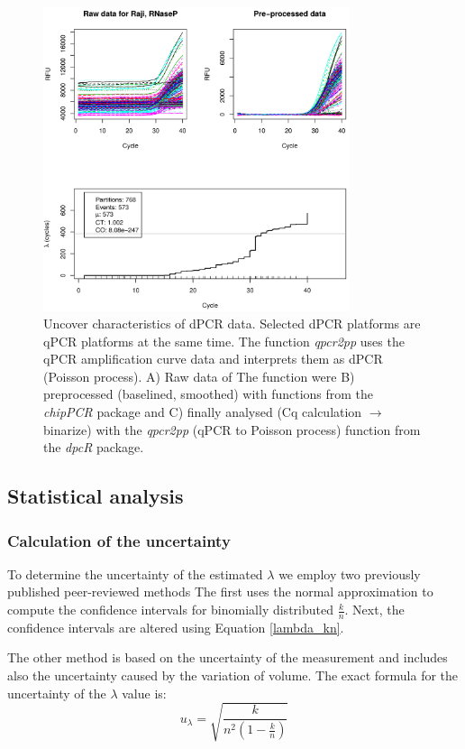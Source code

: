 \documentclass[a4,center,fleqn]{NAR}
\begin{document}
\begin{figure}[t]
\begin{center}
\includegraphics[width=9cm]{qpcr2pp_1.png}
\end{center}
\caption{Uncover characteristics of dPCR data. Selected dPCR platforms are qPCR 
platforms at the same time. The function \textit{qpcr2pp} uses the qPCR 
amplification curve data and interprets them as dPCR (Poisson process). A) Raw 
data of The function were B) preprocessed (baselined, smoothed) with functions 
from the \textit{chipPCR} package and C) finally analysed (Cq calculation 
$\rightarrow$ binarize) with the \textit{qpcr2pp} (qPCR to Poisson process) 
function from the \textit{dpcR} package.} 
\label{qpcr2pp_1}
\end{figure}

\subsection{Statistical analysis}

\subsubsection{Calculation of the uncertainty}
To determine the uncertainty of the estimated $\lambda$ we employ two previously 
published peer-reviewed methods The first \cite{dube_mathematical_2008} uses the 
normal approximation to compute the confidence intervals for binomially 
distributed $\frac{k}{n}$. Next, the confidence intervals are altered using 
Equation \ref{lambda_kn}.

The other method \cite{bhat_single_2009} is based on the uncertainty of the 
measurement and includes also the uncertainty caused by the variation of volume.
The exact formula for the uncertainty of the $\lambda$ value is:
\begin{equation}
u_{\lambda} = \sqrt{\frac{k}{n^2 (1 - \frac{k}{n})}}
\end{equation}
\end{document}
